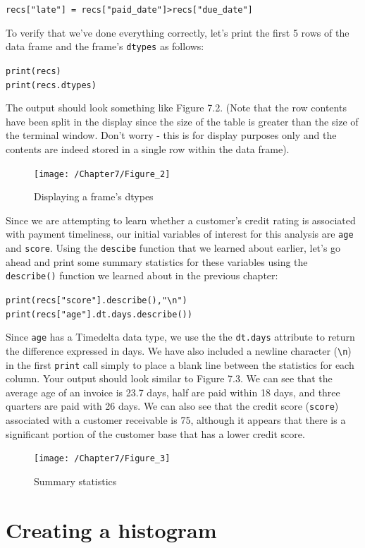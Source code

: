 \documentclass{book}
\begin{document}
\texttt{recs["late"] = recs["paid\_date"]>recs["due\_date"]}

To verify that we've done everything correctly, let's print the first 5 rows of the data frame and the frame's \texttt{dtypes} as follows:

\texttt{print(recs) \\ print(recs.dtypes)}

The output should look something like Figure 7.2. (Note that the row contents have been split in the display since the size of the table is greater than the size of the terminal window. Don't worry - this is for display purposes only and the contents are indeed stored in a single row within the data frame).

\begin{figure}[h]
	\caption{Displaying a frame's dtypes}
	\centering\texttt{[image: /Chapter7/Figure\_2]}
\end{figure}

Since we are attempting to learn whether a customer's credit rating is associated with payment timeliness, our initial variables of interest for this analysis are \texttt{age} and \texttt{score}. Using the \texttt{descibe} function that we learned about earlier, let's go ahead and print some summary statistics for these variables using the \texttt{describe()} function we learned about in the previous chapter:

\texttt{print(recs["score"].describe(),"\textbackslash n") \\print(recs["age"].dt.days.describe())}

Since \texttt{age} has a Timedelta data type, we use the the \texttt{dt.days} attribute to return the difference expressed in days. We have also included a newline character (\texttt{\textbackslash n}) in the first \texttt{print} call simply to place a blank line between the statistics for each column. Your output should look similar to Figure 7.3. We can see that the average age of an invoice is 23.7 days, half are paid within 18 days, and three quarters are paid with 26 days. We can also see that the credit score (\texttt{score}) associated with a customer receivable is 75, although it appears that there is a significant portion of the customer base that has a lower credit score.

\begin{figure}[h]
	\caption{Summary statistics}
	\centering\texttt{[image: /Chapter7/Figure\_3]}
\end{figure}

\section{Creating a histogram}
\end{document}
